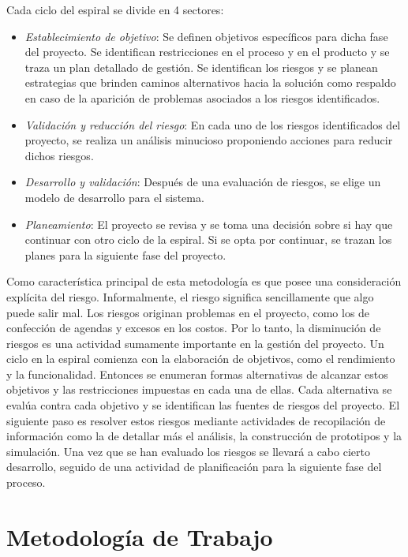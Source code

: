 Cada ciclo del espiral se divide en 4 sectores:
\begin {itemize}
\item \textit{Establecimiento de objetivo}: Se definen objetivos
  específicos para dicha fase del proyecto. Se identifican
  restricciones en el proceso y en el producto y se traza un plan
  detallado de gestión. Se identifican los riesgos y se planean
  estrategias que brinden caminos alternativos hacia la solución como
  respaldo en caso de la aparición de problemas asociados a los
  riesgos identificados.
\item \textit{Validación y reducción del riesgo}: En cada uno de los
  riesgos identificados del proyecto, se realiza un análisis
  minucioso proponiendo acciones para reducir dichos riesgos.
\item \textit{Desarrollo y validación}: Después de una evaluación de
  riesgos, se elige un modelo de desarrollo para el sistema.
\item \textit{Planeamiento}: El proyecto se revisa y se toma una
  decisión sobre si hay que continuar con otro ciclo de la espiral. Si
  se opta por continuar, se trazan los planes para la siguiente fase
  del proyecto.
\end {itemize}

Como característica principal de esta metodología es que posee una
consideración explícita del riesgo. Informalmente, el riesgo significa
sencillamente que algo puede salir mal. Los riesgos originan problemas
en el proyecto, como los de confección de agendas y excesos en los
costos. Por lo tanto, la disminución de riesgos es una actividad
sumamente importante en la gestión del proyecto. Un ciclo en la
espiral comienza con la elaboración de objetivos, como el rendimiento
y la funcionalidad. Entonces se enumeran formas alternativas de
alcanzar estos objetivos y las restricciones impuestas en cada una de
ellas. Cada alternativa se evalúa contra cada objetivo y se
identifican las fuentes de riesgos del proyecto. El siguiente paso es
resolver estos riesgos mediante actividades de recopilación de
información como la de detallar más el análisis, la construcción de
prototipos y la simulación. Una vez que se han evaluado los riesgos se
llevará a cabo cierto desarrollo, seguido de una actividad de
planificación para la siguiente fase del proceso.

\section{Metodología de Trabajo}

